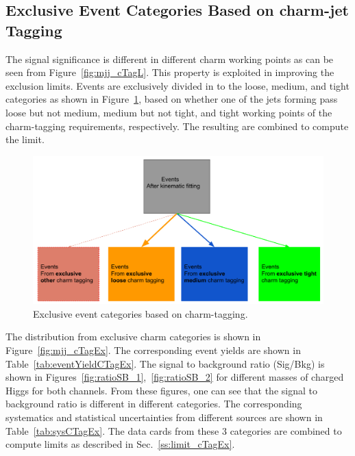 \subsection{Exclusive Event Categories Based on charm-jet Tagging}
\label{ss:mjj_cTagEx}
The signal significance is different in different charm working points as can 
be seen from Figure~\ref{fig:mjj_cTagL}. This property is exploited in improving 
the exclusion limits. Events are exclusively divided in to the loose, medium, 
and tight categories as shown in Figure~\ref{fig:cTagCat}, based on whether one 
of the jets forming \mjj pass loose but not medium, medium but not tight, 
and tight working points of the charm-tagging requirements, respectively. 
The resulting \mjj are combined to compute the limit. 
\begin{figure}
\begin{center}
\includegraphics[width=1.00\textwidth]{Image/Limit/cTagCat.pdf}
\caption{Exclusive event categories based on charm-tagging.}
\label{fig:cTagCat}
\end{center}
\end{figure}
The \mjj distribution from exclusive charm categories is shown in 
Figure~\ref{fig:mjj_cTagEx}. The corresponding event yields are shown in 
Table~\ref{tab:eventYieldCTagEx}. The signal to background ratio (Sig/Bkg) is 
shown in Figures~\ref{fig:ratioSB_1},~\ref{fig:ratioSB_2} for different masses 
of charged Higgs for both channels. From these figures, one can see that the 
signal to background ratio is different in different categories. The 
corresponding systematics and statistical uncertainties from different sources 
are shown in Table~\ref{tab:sysCTagEx}. The data cards from these 3 categories 
are combined to compute limits as described in Sec.~\ref{ss:limit_cTagEx}. 

